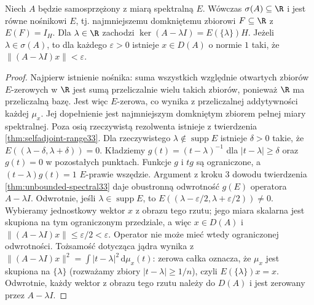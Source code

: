 \begin{wniosek}
\label{cor:unbounded-spectrum33}
Niech $A$ będzie samosprzężony z miarą spektralną $E$.
Wówczas $\sigma(A)\subseteq\R$ i jest równe nośnikowi $E$,
tj. najmniejszemu domkniętemu zbiorowi $F\subseteq\R$
z $E(F)=I_H$. Dla $\lambda\in\R$ zachodzi
$\ker(A-\lambda I)=E(\{\lambda\})H$.
Jeżeli $\lambda\in\sigma(A)$, to dla każdego $\varepsilon>0$
istnieje $x\in D(A)$ o normie $1$ taki, że
$\|(A-\lambda I)x\|<\varepsilon$.
\end{wniosek}
\begin{proof}
Najpierw istnienie nośnika: suma wszystkich względnie otwartych
zbiorów $E$-zerowych w $\R$ jest sumą przeliczalnie wielu
takich zbiorów, ponieważ $\R$ ma przeliczalną bazę.
Jest więc $E$-zerowa, co wynika z przeliczalnej addytywności
każdej $\mu_x$. Jej dopełnienie jest najmniejszym domkniętym
zbiorem pełnej miary spektralnej. Poza osią rzeczywistą
rezolwenta istnieje z twierdzenia \ref{thm:selfadjoint-range33}.
Dla rzeczywistego $\lambda\notin\operatorname{supp}E$ istnieje $\delta>0$
takie, że $E((\lambda-\delta,\lambda+\delta))=0$.
Kładziemy $g(t)=(t-\lambda)^{-1}$ dla $|t-\lambda|\ge\delta$
oraz $g(t)=0$ w pozostałych punktach. Funkcje $g$ i $tg$
są ograniczone, a $(t-\lambda)g(t)=1$ $E$-prawie wszędzie.
Argument z kroku 3 dowodu twierdzenia \ref{thm:unbounded-spectral33}
daje obustronną odwrotność $g(E)$ operatora $A-\lambda I$. Odwrotnie, jeśli
$\lambda\in\operatorname{supp}E$, to
$E((\lambda-\varepsilon/2,\lambda+\varepsilon/2))\ne0$.
Wybieramy jednostkowy wektor $x$ z obrazu tego rzutu;
jego miara skalarna jest skupiona na tym ograniczonym przedziale,
a więc $x\in D(A)$ i $\|(A-\lambda I)x\|\le\varepsilon/2<\varepsilon$. Operator nie może mieć wtedy
ograniczonej odwrotności. Tożsamość dotycząca jądra wynika
z $\|(A-\lambda I)x\|^2=\int|t-\lambda|^2\,\mathrm d\mu_x(t)$:
zerowa całka oznacza, że $\mu_x$ jest skupiona na $\{\lambda\}$
(rozważamy zbiory $|t-\lambda|\ge1/n$), czyli $E(\{\lambda\})x=x$.
Odwrotnie, każdy wektor z obrazu tego rzutu należy do $D(A)$
i jest zerowany przez $A-\lambda I$.
\end{proof}

